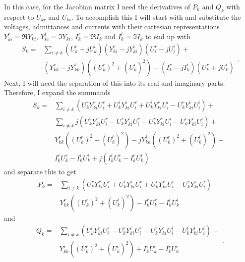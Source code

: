 In this case, for the Jacobian matrix I need the derivatives of $P_k$ and $Q_k$ with respect to $U_{kr}$ and $U_{ki}$. To accomplish this I will start with  and substitute the voltages, admittances and currents with their cartesian representations $Y_{ki}^r = \Re{Y_{ki}}$, $Y_{ki}^i = \Im{Y_{ki}}$, $I_k^r = \Re{I_k}$ and $I_k^i = \Im{I_k}$ to end up with
\begin{equation}
	\begin{split}
		S_k = & \sum_{i \ne k} (U_k^r + j U_k^i) (Y_{ki}^r - j Y_{ki}^i) (U_i^r - j U_i^i) + \\
			  & (Y_{kk}^r - j Y_{kk}^i) ( (U_k^r)^2 + (U_k^i)^2 ) - (I_k^r - j I_k^i) (U_k^r + j U_k^i)			
	\end{split}.
\end{equation}
Next, I will need the separation of this into its real and imaginary parts. Therefore, I expand the summands
\begin{equation}
	\begin{split}
		S_k = & \sum_{i \ne k} \left( U_k^r Y_{ki}^r U_i^r + U_k^i Y_{ki}^i U_i^r + U_k^i Y_{ki}^r U_i^i - U_k^r Y_{ki}^i U_i^i \right) + \\
			  & \sum_{i \ne k} j \left( U_k^i Y_{ki}^r U_i^r - U_k^r Y_{ki}^i U_i^r - U_k^r Y_{ki}^r U_i^i - U_k^i Y_{ki}^i U_i^i \right) + \\
			  & Y_{kk}^r ( (U_k^r)^2 + (U_k^i)^2 ) - j Y_{kk}^i ( (U_k^r)^2 + (U_k^i)^2 ) - \\
			  & I_k^r U_k^r - I_k^i U_k^i + j (I_k^i U_k^r - I_k^r U_k^i)
	\end{split}
\end{equation}
and separate this to get
\begin{equation}
	\begin{split}
		P_k = & \sum_{i \ne k} \left( U_k^r Y_{ki}^r U_i^r + U_k^i Y_{ki}^i U_i^r + U_k^i Y_{ki}^r U_i^i - U_k^r Y_{ki}^i U_i^i \right) + \\
			  & Y_{kk}^r ( (U_k^r)^2 + (U_k^i)^2 ) - I_k^r U_k^r - I_k^i U_k^i
	\end{split}
\end{equation}
and
\begin{equation}
	\begin{split}
		Q_k = & \sum_{i \ne k} \left( U_k^i Y_{ki}^r U_i^r - U_k^r Y_{ki}^i U_i^r - U_k^r Y_{ki}^r U_i^i - U_k^i Y_{ki}^i U_i^i \right) - \\
			  & Y_{kk}^i ( (U_k^r)^2 + (U_k^i)^2 ) + I_k^i U_k^r - I_k^r U_k^i
	\end{split}.
\end{equation}

